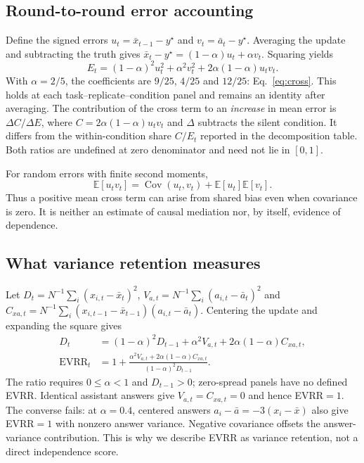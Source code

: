 \documentclass[10pt]{article}
\theoremstyle{manuscript}\newtheorem{proposition}{Proposition}
\newcommand{\E}{\mathbb E}
\newcommand{\Cov}{\operatorname{Cov}}
\begin{document}
\subsection{Round-to-round error accounting}
Define the signed errors $u_t=\bar x_{t-1}-y^\star$ and $v_t=\bar a_t-y^\star$. Averaging the update and subtracting the truth gives $\bar x_t-y^\star=(1-\alpha)u_t+\alpha v_t$. Squaring yields
\begin{equation}\label{eq:general-cross}
E_t=(1-\alpha)^2u_t^2+\alpha^2v_t^2+2\alpha(1-\alpha)u_tv_t.
\end{equation}
With $\alpha=2/5$, the coefficients are $9/25$, $4/25$ and $12/25$: Eq.~\eqref{eq:cross}. This holds at each task--replicate--condition panel and remains an identity after averaging. The contribution of the cross term to an \emph{increase} in mean error is $\Delta C/\Delta E$, where $C=2\alpha(1-\alpha)u_tv_t$ and $\Delta$ subtracts the silent condition. It differs from the within-condition share $C/E_t$ reported in the decomposition table. Both ratios are undefined at zero denominator and need not lie in $[0,1]$.

For random errors with finite second moments,
\begin{equation}\label{eq:bias-cov}
\E[u_tv_t]=\Cov(u_t,v_t)+\E[u_t]\E[v_t].
\end{equation}
Thus a positive mean cross term can arise from shared bias even when covariance is zero. It is neither an estimate of causal mediation nor, by itself, evidence of dependence.

\subsection{What variance retention measures}
Let $D_t=N^{-1}\sum_i(x_{i,t}-\bar x_t)^2$, $V_{a,t}=N^{-1}\sum_i(a_{i,t}-\bar a_t)^2$ and $C_{xa,t}=N^{-1}\sum_i(x_{i,t-1}-\bar x_{t-1})(a_{i,t}-\bar a_t)$. Centering the update and expanding the square gives
\begin{align}
D_t&=(1-\alpha)^2D_{t-1}+\alpha^2 V_{a,t}
       +2\alpha(1-\alpha)C_{xa,t},\label{eq:variance-update}\\[2pt]
\mathrm{EVRR}_t
&=1+\frac{\alpha^2 V_{a,t}+2\alpha(1-\alpha)C_{xa,t}}
              {(1-\alpha)^2D_{t-1}}.\label{eq:evrr}
\end{align}
The ratio requires $0\le\alpha<1$ and $D_{t-1}>0$; zero-spread panels have no defined EVRR. Identical assistant answers give $V_{a,t}=C_{xa,t}=0$ and hence EVRR$=1$. The converse fails: at $\alpha=0.4$, centered answers $a_i-\bar a=-3(x_i-\bar x)$ also give EVRR$=1$ with nonzero answer variance. Negative covariance offsets the answer-variance contribution. This is why we describe EVRR as variance retention, not a direct independence score.
\end{document}
